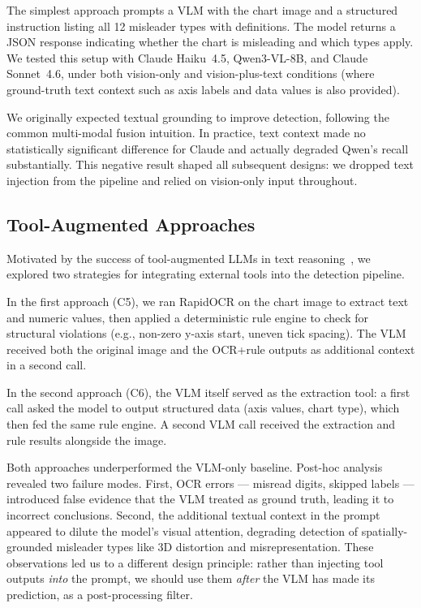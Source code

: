 The simplest approach prompts a VLM with the chart image and a structured instruction listing all 12 misleader types with definitions. The model returns a JSON response indicating whether the chart is misleading and which types apply. We tested this setup with Claude Haiku~4.5, Qwen3-VL-8B, and Claude Sonnet~4.6, under both vision-only and vision-plus-text conditions (where ground-truth text context such as axis labels and data values is also provided).

We originally expected textual grounding to improve detection, following the common multi-modal fusion intuition. In practice, text context made no statistically significant difference for Claude and actually degraded Qwen's recall substantially. This negative result shaped all subsequent designs: we dropped text injection from the pipeline and relied on vision-only input throughout.

\subsection{Tool-Augmented Approaches}
\label{sec:tools}

Motivated by the success of tool-augmented LLMs in text reasoning~\cite{yao2023react,schick2023toolformer}, we explored two strategies for integrating external tools into the detection pipeline.

In the first approach (C5), we ran RapidOCR on the chart image to extract text and numeric values, then applied a deterministic rule engine to check for structural violations (e.g., non-zero y-axis start, uneven tick spacing). The VLM received both the original image and the OCR+rule outputs as additional context in a second call.

In the second approach (C6), the VLM itself served as the extraction tool: a first call asked the model to output structured data (axis values, chart type), which then fed the same rule engine. A second VLM call received the extraction and rule results alongside the image.

Both approaches underperformed the VLM-only baseline. Post-hoc analysis revealed two failure modes. First, OCR errors --- misread digits, skipped labels --- introduced false evidence that the VLM treated as ground truth, leading it to incorrect conclusions. Second, the additional textual context in the prompt appeared to dilute the model's visual attention, degrading detection of spatially-grounded misleader types like 3D distortion and misrepresentation. These observations led us to a different design principle: rather than injecting tool outputs \textit{into} the prompt, we should use them \textit{after} the VLM has made its prediction, as a post-processing filter.

